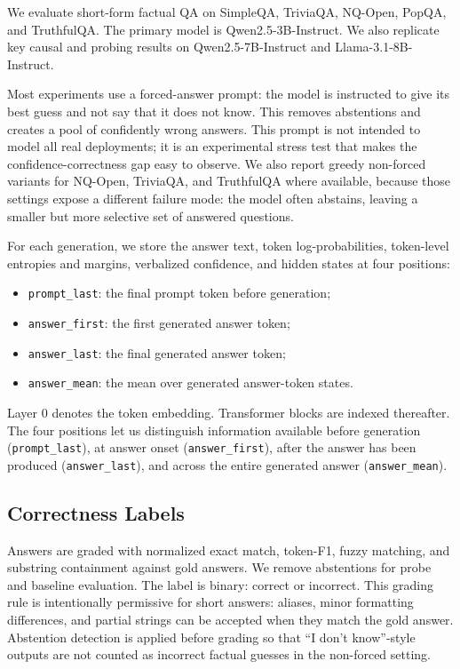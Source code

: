 \documentclass[11pt]{article}
\newcommand{\qwen}{Qwen2.5-3B-Instruct}
\begin{document}
We evaluate short-form factual QA on SimpleQA, TriviaQA, NQ-Open, PopQA, and
TruthfulQA. The primary model is \qwen{}. We also replicate key causal and probing
results on Qwen2.5-7B-Instruct and Llama-3.1-8B-Instruct.

Most experiments use a forced-answer prompt: the model is instructed to give its
best guess and not say that it does not know. This removes abstentions and creates
a pool of confidently wrong answers. This prompt is not intended to model all
real deployments; it is an experimental stress test that makes the
confidence-correctness gap easy to observe. We also report greedy non-forced
variants for NQ-Open, TriviaQA, and TruthfulQA where available, because those
settings expose a different failure mode: the model often abstains, leaving a
smaller but more selective set of answered questions.

For each generation, we store the answer text, token log-probabilities,
token-level entropies and margins, verbalized confidence, and hidden states at
four positions:
\begin{itemize}
    \item \texttt{prompt\_last}: the final prompt token before generation;
    \item \texttt{answer\_first}: the first generated answer token;
    \item \texttt{answer\_last}: the final generated answer token;
    \item \texttt{answer\_mean}: the mean over generated answer-token states.
\end{itemize}
Layer 0 denotes the token embedding. Transformer blocks are indexed thereafter.
The four positions let us distinguish information available before generation
(\texttt{prompt\_last}), at answer onset (\texttt{answer\_first}), after the answer
has been produced (\texttt{answer\_last}), and across the entire generated answer
(\texttt{answer\_mean}).

\subsection{Correctness Labels}

Answers are graded with normalized exact match, token-F1, fuzzy matching, and
substring containment against gold answers. We remove abstentions for probe and
baseline evaluation. The label is binary: correct or incorrect.
This grading rule is intentionally permissive for short answers: aliases,
minor formatting differences, and partial strings can be accepted when they match
the gold answer. Abstention detection is applied before grading so that ``I don't
know''-style outputs are not counted as incorrect factual guesses in the
non-forced setting.
\end{document}
